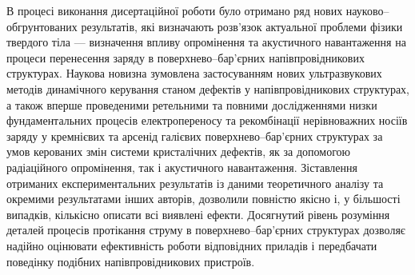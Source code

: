 {\noveltyTXT}
В процесі виконання дисертаційної роботи було отримано ряд нових науково--обгрунтованих
результатів, які
визначають розв'язок актуальної проблеми фізики твердого тіла ---
визначення впливу опромінення та акустичного навантаження на процеси перенесення заряду в поверхнево--бар'єрних напівпровідникових структурах.
Наукова новизна зумовлена застосуванням нових ультразвукових методів динамічного керування станом дефектів у напівпровідникових структурах, а також вперше проведеними ретельними та повними дослідженнями низки фундаментальних процесів електропереносу та рекомбінації нерівноважних носіїв заряду у кремнієвих та арсенід галієвих  поверхнево--бар'єрних структурах за умов керованих змін системи кристалічних дефектів, як за допомогою радіаційного опромінення, так і акустичного навантаження.
Зіставлення отриманих експериментальних результатів із даними теоретичного аналізу та окремими результатами інших авторів, дозволили повністю якісно і, у більшості випадків, кількісно описати всі виявлені ефекти.
Досягнутий рівень розуміння деталей процесів протікання струму в поверхнево--бар'єрних структурах дозволяє надійно оцінювати ефективність роботи відповідних приладів і передбачати поведінку подібних напівпровідникових пристроїв.

